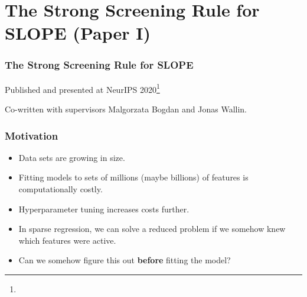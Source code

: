 \documentclass[10pt]{beamer}
\begin{document}
\section{The Strong Screening Rule for SLOPE (Paper I)}

\begin{frame}[c]
  \frametitle{The Strong Screening Rule for SLOPE}

  Published and presented at NeurIPS 2020\footnote{}

  \bigskip

  Co-written with supervisors Malgorzata Bogdan and Jonas Wallin.

  \begin{center}
    \hfill%
    \hfill%
    \hfill\null
  \end{center}

\end{frame}

\begin{frame}[c]
  \frametitle{Motivation}

  \begin{itemize}
    \item Data sets are growing in size.
    \item Fitting models to sets of millions (maybe billions) of features is computationally costly.
    \item Hyperparameter tuning increases costs further.
    \item In sparse regression, we can solve a reduced problem if we somehow knew which features were
          active.
    \item Can we somehow figure this out \textbf{before} fitting the model?
  \end{itemize}

\end{frame}
\end{document}
